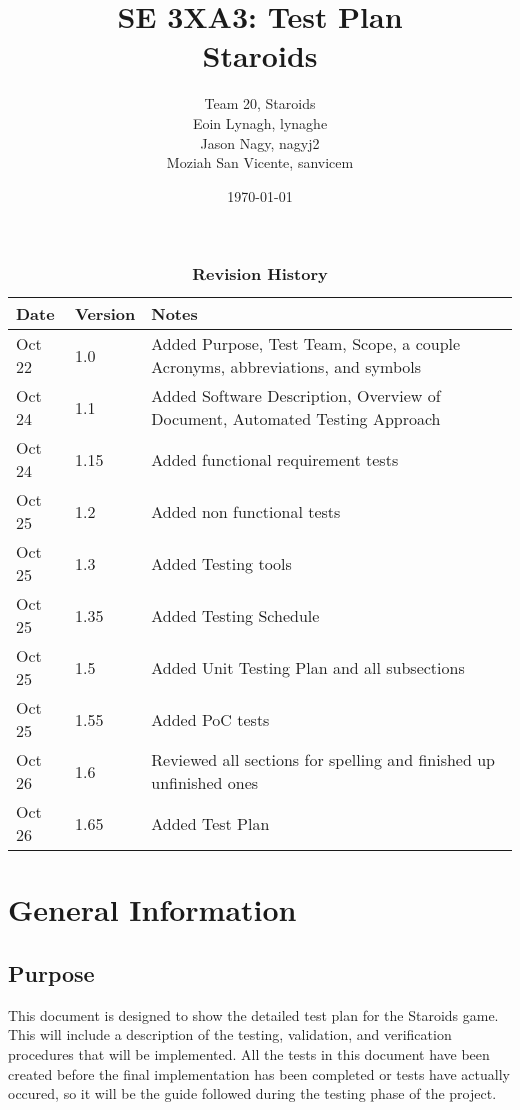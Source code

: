 \documentclass[12pt, titlepage]{article}
\title{SE 3XA3: Test Plan\\Staroids}
\author{Team 20, Staroids
		\\ Eoin Lynagh, lynaghe
		\\ Jason Nagy, nagyj2
		\\ Moziah San Vicente, sanvicem
}
\date{\today}
\begin{document}
\maketitle

\tableofcontents
\listoftables
\listoffigures

\begin{table}[h]
\caption{\bf Revision History}
\begin{tabularx}{\textwidth}{p{3cm}p{2cm}X}
\toprule {\bf Date} & {\bf Version} & {\bf Notes}\\
\midrule
Oct 22 & 1.0 & Added Purpose, Test Team, Scope, a couple Acronyms, abbreviations, and symbols\\
Oct 24 & 1.1 & Added Software Description, Overview of Document, Automated Testing Approach\\
Oct 24 & 1.15 & Added functional requirement tests\\
Oct 25 & 1.2 & Added non functional tests\\
Oct 25 & 1.3 & Added Testing tools\\
Oct 25 & 1.35 & Added Testing Schedule\\
Oct 25 & 1.5 & Added Unit Testing Plan and all subsections\\
Oct 25 & 1.55 & Added PoC tests\\
Oct 26 & 1.6 & Reviewed all sections for spelling and finished up unfinished ones\\
Oct 26 & 1.65 & Added Test Plan\\
\bottomrule
\end{tabularx}
\end{table}

\newpage


\section{General Information}

\subsection{Purpose}
This document is designed to show the detailed test plan for the Staroids game. This will include a description of the testing, validation, and verification procedures that will be implemented. All the tests in this document have been created before the final implementation has been completed or tests have actually occured, so it will be the guide followed during the testing phase of the project.
\end{document}
